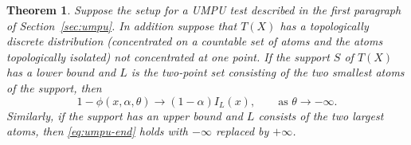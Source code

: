 \documentclass{article}
\newtheorem{theorem}{Theorem}
\begin{document}
\begin{theorem} \label{th:umpu-end}
Suppose the setup for a UMPU test described
in the first paragraph of Section~\ref{sec:umpu}.
In addition suppose that $T(X)$ has a topologically discrete distribution
(concentrated on a countable set of atoms
and the atoms topologically isolated) not concentrated at one point.
If the support $S$ of $T(X)$ has a lower bound and $L$ is the two-point
set consisting of the two smallest atoms of the support, then
\begin{equation} \label{eq:umpu-end}
   1 - \phi(x, \alpha, \theta) \to (1 - \alpha) I_L(x),
   \qquad \text{as $\theta \to - \infty$}.
\end{equation}
Similarly, if the support has an upper bound and $L$ consists of the two
largest atoms, then \eqref{eq:umpu-end} holds with $- \infty$ replaced by
$+ \infty$.
\end{theorem}
\end{document}
